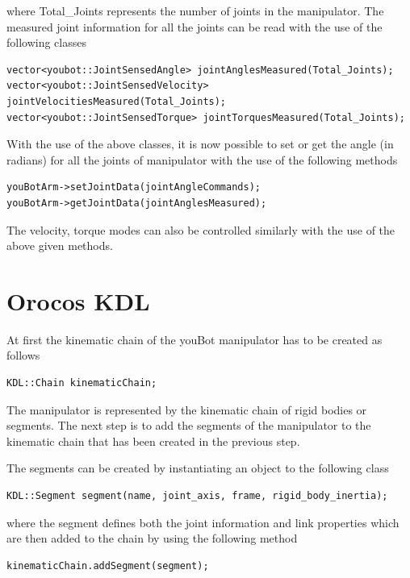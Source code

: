 where Total\_Joints represents the number of joints in the manipulator. The measured joint information for all the joints can be read with the use of the following classes

\begin{verbatim}
vector<youbot::JointSensedAngle> jointAnglesMeasured(Total_Joints);
vector<youbot::JointSensedVelocity> jointVelocitiesMeasured(Total_Joints);
vector<youbot::JointSensedTorque> jointTorquesMeasured(Total_Joints);
\end{verbatim}

With the use of the above classes, it is now possible to set or get the angle (in radians) for all the joints of manipulator with the use of the following methods

\begin{verbatim}
youBotArm->setJointData(jointAngleCommands);
youBotArm->getJointData(jointAnglesMeasured);
\end{verbatim}

The velocity, torque modes can also be controlled similarly with the use of the above given methods. 

\chapter{Orocos KDL}
\label{sec:appendixB}

At first the kinematic chain of the youBot manipulator has to be created as follows

\begin{verbatim}
KDL::Chain kinematicChain;
\end{verbatim}

The manipulator is represented by the kinematic chain of rigid bodies or segments. The next step is to add the segments of the manipulator to the kinematic chain that has been created in the previous step. 

The segments can be created by instantiating an object to the following class

\begin{verbatim}
KDL::Segment segment(name, joint_axis, frame, rigid_body_inertia);
\end{verbatim}

where the segment defines both the joint information and link properties which are then added to the chain by using the following method

\begin{verbatim}
kinematicChain.addSegment(segment);
\end{verbatim} 

